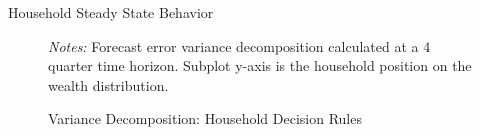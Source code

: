 \begin{table}[t]
    \centering
    \caption{Household Steady State Behavior}
    
    \label{tab:ss-dists}
\end{table}


\begin{figure}[t!]  %
    \centering
    \caption{Variance Decomposition: Household Decision Rules}
    
    {\scriptsize \textit{Notes:} Forecast error variance decomposition calculated at a 4 quarter time horizon. Subplot y-axis is the household position on the wealth distribution.}
    \label{fig:hh-var-decomp}
\end{figure}


